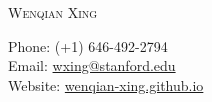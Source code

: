 \documentclass[letterpaper, 10pt]{article}
\begin{document}

\noindent
\begin{minipage}[t]{0.62\textwidth}
    {\fontsize{32pt}{32pt}\selectfont\scshape Wenqian Xing}
\end{minipage}
\begin{minipage}[t]{0.357\textwidth}
    \raggedleft
    \vspace{-1.05cm}
    Phone: (+1) 646-492-2794 \\
    Email: \href{mailto:wxing@stanford.edu}{wxing@stanford.edu} \\
    Website: \href{https://wenqian-xing.github.io}{wenqian-xing.github.io}
\end{minipage}

\vspace{.4cm}

\setlength{\tabcolsep}{8pt}
\end{document}
